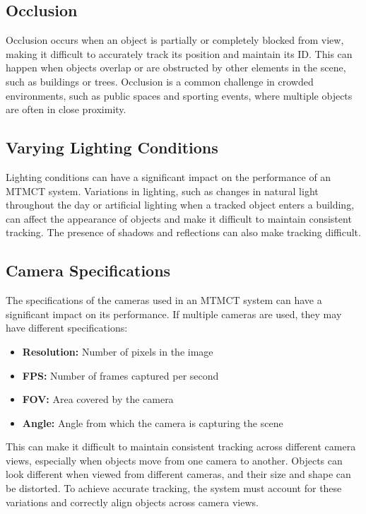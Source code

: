 \subsection{Occlusion}\label{subsec:occlusion}
Occlusion occurs when an object is partially or completely blocked from view, making it difficult to accurately track its position and maintain its ID. This can happen when objects overlap or are obstructed by other elements in the scene, such as buildings or trees. Occlusion is a common challenge in crowded environments, such as public spaces and sporting events, where multiple objects are often in close proximity.

\subsection{Varying Lighting Conditions}\label{subsec:varying_lighting_conditions}
Lighting conditions can have a significant impact on the performance of an MTMCT system. Variations in lighting, such as changes in natural light throughout the day or artificial lighting when a tracked object enters a building, can affect the appearance of objects and make it difficult to maintain consistent tracking. The presence of shadows and reflections can also make tracking difficult.

\subsection{Camera Specifications}\label{subsec:camera_specification}
The specifications of the cameras used in an MTMCT system can have a significant impact on its performance. If multiple cameras are used, they may have different specifications:

\begin{itemize}
    \item \textbf{Resolution:} Number of pixels in the image
    \item \textbf{FPS:} Number of frames captured per second
    \item \textbf{FOV:} Area covered by the camera
    \item \textbf{Angle:} Angle from which the camera is capturing the scene
\end{itemize}

This can make it difficult to maintain consistent tracking across different camera views, especially when objects move from one camera to another. Objects can look different when viewed from different cameras, and their size and shape can be distorted. To achieve accurate tracking, the system must account for these variations and correctly align objects across camera views.


